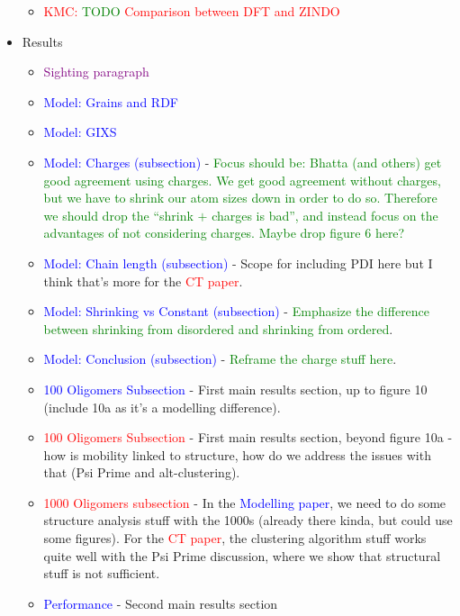 \documentclass[12pt]{article}
\begin{document}
\begin{itemize}
{\begin{itemize}
            \item{\textcolor{red}{KMC: \textcolor{green}{TODO} Comparison between DFT and ZINDO}}
        \end{itemize}}
    \item{Results
        \begin{itemize}
            \item{\textcolor{purple}{Sighting paragraph}}
            \item{\textcolor{blue}{Model: Grains and RDF}}
            \item{\textcolor{blue}{Model: GIXS}}
            \item{\textcolor{blue}{Model: Charges (subsection)} - \textcolor{green}{Focus should be: Bhatta (and others) get good agreement using charges. We get good agreement without charges, but we have to shrink our atom sizes down in order to do so. Therefore we should drop the ``shrink $+$ charges is bad'', and instead focus on the advantages of not considering charges. Maybe drop figure 6 here?}}
            \item{\textcolor{blue}{Model: Chain length (subsection)} - Scope for including PDI here but I think that's more for the \textcolor{red}{CT paper}.}
            \item{\textcolor{blue}{Model: Shrinking vs Constant (subsection)} - \textcolor{green}{Emphasize the difference between shrinking from disordered and shrinking from ordered}.}
            \item{\textcolor{blue}{Model: Conclusion (subsection)} - \textcolor{green}{Reframe the charge stuff here}.}
            \item{\textcolor{blue}{100 Oligomers Subsection} - First main results section, up to figure 10 (include 10a as it's a modelling difference).}
            \item{\textcolor{red}{100 Oligomers Subsection} - First main results section, beyond figure 10a - how is mobility linked to structure, how do we address the issues with that (Psi Prime and alt-clustering).}
            \item{\textcolor{red}{1000 Oligomers subsection} - In the \textcolor{blue}{Modelling paper}, we need to do some structure analysis stuff with the 1000s (already there kinda, but could use some figures). For the \textcolor{red}{CT paper}, the clustering algorithm stuff works quite well with the Psi Prime discussion, where we show that structural stuff is not sufficient.}
            \item{\textcolor{blue}{Performance} - Second main results section}

\end{itemize}}
\end{itemize}
\end{document}
